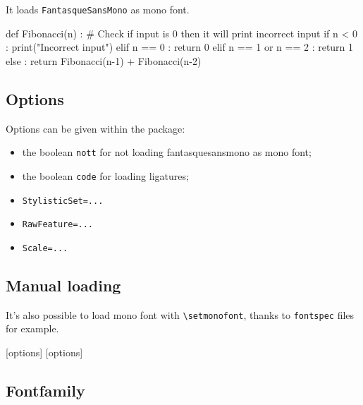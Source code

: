 \documentclass[a4paper]{scrartcl}
\newcommand*{\opt}[1]{\texttt{#1}}
\newcommand*{\cmd}[1]{\texttt{\textbackslash #1}}\newcommand*{\showtchar}[1]{\cmd{#1}~\csname #1\endcsname}
\begin{document}
It loads \opt{FantasqueSansMono} as mono font.

\medskip

\begin{codeblock}[minted language=python3, title=Sample python code]
def Fibonacci(n) :
  # Check if input is 0 then it will print incorrect input
  if n < 0 :
    print("Incorrect input")
  elif n == 0 :
    return 0
  elif n == 1 or n == 2 :
    return 1
  else :
    return Fibonacci(n-1) + Fibonacci(n-2)
\end{codeblock}

\subsection{Options}

Options can be given within the package:

\begin{itemize}
	\item the boolean \opt{nott} for not loading fantasquesansmono as mono font;
  \item the boolean \opt{code} for loading ligatures;
	\item \opt{StylisticSet=...}
	\item \opt{RawFeature=...}
	\item \opt{Scale=...}
\end{itemize}

\subsection{Manual loading}

It's also possible to load mono font with \cmd{setmonofont}, thanks to \opt{fontspec} files for example.

\begin{codeblock}[minted language=latex, title=Manual loading]
\usepackage{fontspec}
\setmonofont{FantasqueSansMono}[options]
\setmonofont{FantasqueSansCode}[options]
\end{codeblock}

\subsection{Fontfamily}
\end{document}
